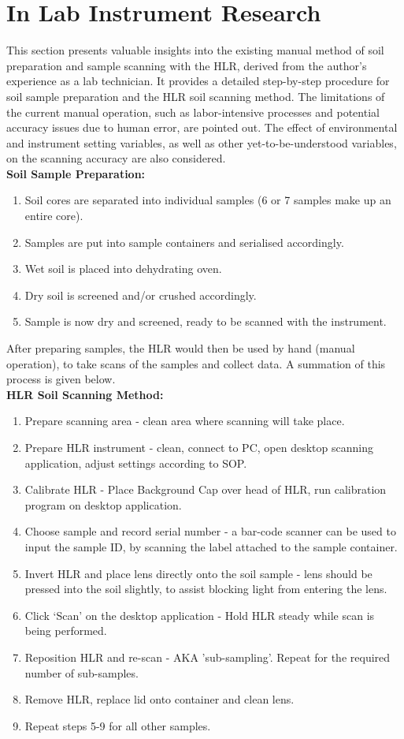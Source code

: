 \documentclass{UoNMCHA}
\numberwithin{equation}{section}
\begin{document}
\section{In Lab Instrument Research}\label{sec:Instrument Research}
This section presents valuable insights into the existing manual method of soil preparation and sample scanning with the HLR, derived from the author's experience as a lab technician. It provides a detailed step-by-step procedure for soil sample preparation and the HLR soil scanning method. The limitations of the current manual operation, such as labor-intensive processes and potential accuracy issues due to human error, are pointed out. The effect of environmental and instrument setting variables, as well as other yet-to-be-understood variables, on the scanning accuracy are also considered.\\
\textbf{Soil Sample Preparation:}\\
\begin{enumerate}
	\item Soil cores are separated into individual samples (6 or 7 samples make up an entire core).
	\item Samples are put into sample containers and serialised accordingly.
	\item Wet soil is placed into dehydrating oven.
	\item Dry soil is screened and/or crushed accordingly.
	\item Sample is now dry and screened, ready to be scanned with the instrument. 
\end{enumerate}
After preparing samples, the HLR would then be used by hand (manual operation), to take scans of the samples and collect data. A summation of this process is given below.\\
\textbf{HLR Soil Scanning Method:}\\
\begin{enumerate}	
	\item Prepare scanning area - clean area where scanning will take place. 
	\item Prepare HLR instrument - clean, connect to PC, open desktop scanning application, adjust settings according to SOP.
	\item Calibrate HLR - Place Background Cap over head of HLR, run calibration program on desktop application.
	\item Choose sample and record serial number - a bar-code scanner can be used to input the sample ID, by scanning the label attached to the sample container.
	\item Invert HLR and place lens directly onto the soil sample - lens should be pressed into the soil slightly, to assist blocking light from entering the lens.
	\item Click ‘Scan’ on the desktop application - Hold HLR steady while scan is being performed.
	\item Reposition HLR and re-scan - AKA 'sub-sampling'. Repeat for the required number of sub-samples. 
	\item Remove HLR, replace lid onto container and clean lens.
	\item Repeat steps 5-9 for all other samples.
\end{enumerate}
\end{document}

